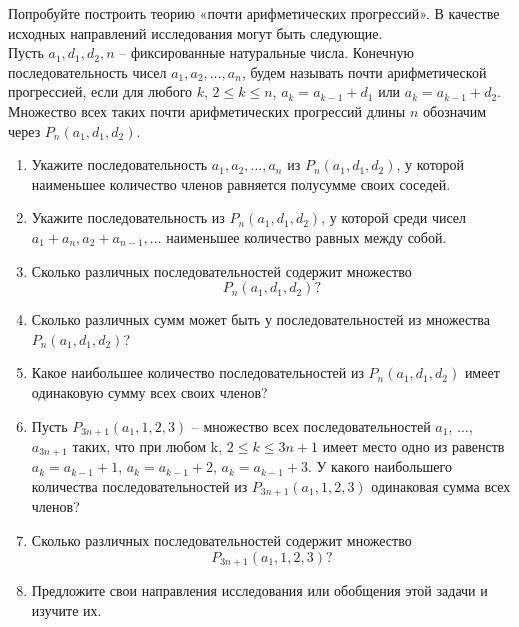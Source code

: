 Попробуйте построить теорию «почти арифметических прогрессий». В качестве исходных направлений исследования могут быть следующие.\\
Пусть $a_1, d_1, d_2, n$ – фиксированные натуральные числа. Конечную последовательность чисел $a_1, a_2, …, a_n$, будем называть почти арифметической прогрессией, если для любого $k$, $2 \leq k \leq n$, $a_k=a_{k-1}+d_1$ или $a_k=a_{k-1}+d_2$. Множество всех таких почти арифметических прогрессий длины $n$ обозначим через $P_n(a_1,d_1,d_2)$.\\
\begin{enumerate}
\item Укажите последовательность $a_1, a_2, \dots , a_n$ из $P_n(a_1,d_1,d_2)$, у которой наименьшее количество членов равняется полусумме своих соседей.
\item Укажите последовательность из $P_n(a_1,d_1,d_2)$, у которой среди чисел $a_1+a_n, a_2+a_{n-1},...$ наименьшее количество равных между собой.
\item Сколько различных последовательностей содержит множество
$$P_n(a_1,d_1,d_2)?$$
\item Сколько различных сумм может быть у последовательностей из множества $P_n(a_1,d_1,d_2)$?
\item Какое наибольшее количество последовательностей из $P_n(a_1,d_1,d_2)$ имеет одинаковую сумму всех своих членов?
\item Пусть $P_{3n+1}(a_1,1,2,3)$ – множество всех последовательностей $a_1$, $\dots$, $a_{3n+1}$ таких, что при любом k, $2 \leq k \leq 3n+1$ имеет место одно из равенств $a_k=a_{k-1}+1$, $a_k=a_{k-1}+2$, $a_k=a_{k-1}+3$. У какого наибольшего количества последовательностей из $P_{3n+1}(a_1,1,2,3)$ одинаковая сумма всех членов?
\item Сколько различных последовательностей содержит множество
$$P_{3n+1}(a_1,1,2,3)?$$
\item Предложите свои направления исследования или обобщения этой задачи и изучите их.
\end{enumerate}


